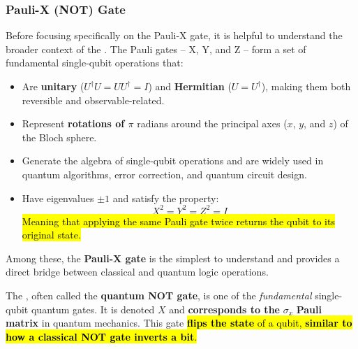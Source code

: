 \subsubsection{Pauli-X (NOT) Gate}\label{sec:pauli-x-not-gate}

Before focusing specifically on the Pauli-X gate, it is helpful to understand the broader context of the . The Pauli gates -- X, Y, and Z -- form a set of fundamental single-qubit operations that:
\begin{itemize}
   \item Are \textbf{unitary} ($U^{\dagger} U = U U^{\dagger} = I$) and \textbf{Hermitian} ($U = U^{\dagger}$), making them both reversible and observable-related.
   \item Represent \textbf{rotations of $\pi$} radians around the principal axes ($x$, $y$, and $z$) of the Bloch sphere.
   \item Generate the algebra of single-qubit operations and are widely used in quantum algorithms, error correction, and quantum circuit design.
   \item Have eigenvalues $\pm 1$ and satisfy the property:
   \begin{equation*}
      X^{2} = Y^{2} = Z^{2} = I
   \end{equation*}
   \hl{Meaning that applying the same Pauli gate twice returns the qubit to its original state.}
\end{itemize}
Among these, the \textbf{Pauli-X gate} is the simplest to understand and provides a direct bridge between classical and quantum logic operations.

\highspace
The , often called the \textbf{quantum NOT gate}, is one of the \emph{fundamental} single-qubit quantum gates. It is denoted $X$ and \textbf{corresponds to the} $\sigma_{x}$ \textbf{Pauli matrix} in quantum mechanics. This gate \hl{\textbf{flips the state} of a qubit, \textbf{similar to how a classical NOT gate inverts a bit}.}


